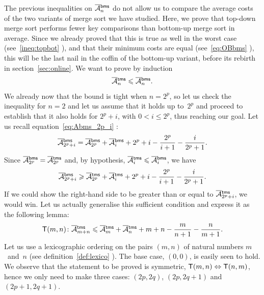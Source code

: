 The previous inequalities on \(\OM{\fun{bms}}{n}\) do not allow us to
compare the average costs of the two variants of merge sort we have
studied. Here, we prove that top\hyp{}down merge sort performs fewer
key comparisons than bottom\hyp{}up merge sort in average. Since we
already proved that this is true as well in the worst case
(see~\eqref{ineq:topbot} ), and that their
minimum costs are equal (see~\eqref{eq:OBbms} ),
this will be the last nail in the coffin of the bottom\hyp{}up
variant, before its rebirth in section~\vref{sec:online}. We want to
prove by induction
\begin{equation*}
\OM{\fun{tms}}{n} \leqslant \OM{\fun{bms}}{n}.
\end{equation*}
We already now that the bound is tight when \(n=2^p\), so let us check
the inequality for \(n=2\) and let us assume that it holds up
to~\(2^p\) and proceed to establish that it also holds for \(2^p+i\),
with \(0 < i \leqslant 2^p\), thus reaching our goal. Let us recall
equation~\eqref{eq:Abms_2p_i} :
\begin{equation*}
\OM{\fun{bms}}{2^p+i} = \OM{\fun{bms}}{2^p} + \OM{\fun{bms}}{i}
+ 2^p + i - \frac{2^p}{i+1} - \frac{i}{2^p+1}.
\end{equation*}
Since \(\OM{\fun{bms}}{2^p} = \OM{\fun{tms}}{2^p}\) and, by
hypothesis, \(\OM{\fun{tms}}{i} \leqslant \OM{\fun{bms}}{i}\), we have
\begin{equation}
\OM{\fun{bms}}{2^p+i} \geqslant \OM{\fun{tms}}{2^p} + \OM{\fun{tms}}{i}
+ 2^p + i - \frac{2^p}{i+1} - \frac{i}{2^p+1}.
\label{ineq:Atms_Abms}
\end{equation}
If we could show the right\hyp{}hand side to be greater than or equal
to \(\OM{\fun{tms}}{2^p+i}\), we would win. Let us actually generalise
this sufficient condition and express it as the following lemma:
\begin{equation*}
  \pred{T}{m,n} \colon
  \OM{\fun{tms}}{m+n} \leqslant \OM{\fun{tms}}{m} + \OM{\fun{tms}}{n} +
  m + n - \frac{m}{n+1} - \frac{n}{m+1}.
\end{equation*}
Let us use a lexicographic ordering on the pairs \((m,n)\) of natural
numbers \(m\)~and~\(n\) (see definition~\eqref{def:lexico}
). The base case, \((0,0)\), is easily seen to
hold. We observe that the statement to be proved is symmetric,
\(\textsf{T}({m,n}) \Leftrightarrow \textsf{T}({n,m})\), hence we only need to
make three cases: \((2p,2q)\), \((2p,2q+1)\) and \((2p+1,2q+1)\).
